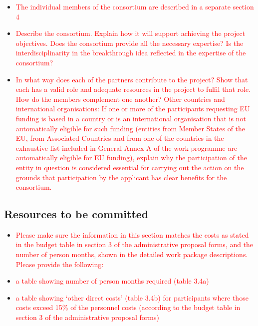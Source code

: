 \documentclass[12pt, a4paper]{article} %
\begin{document}
  \begin{itemize}
    \item \textcolor{red}{The individual members of the consortium are
        described in a separate section 4}
      \item \textcolor{red}{Describe the consortium. Explain how it will
    support achieving the project objectives.  Does the consortium
    provide all the necessary expertise? Is the interdisciplinarity in
    the breakthrough idea reflected in the expertise of the
    consortium?}
\item \textcolor{red}{In what way does each of the partners contribute
    to the project? Show that each has a valid role and adequate
    resources in the project to fulfil that role. How do the members
    complement one another? Other countries and international
    organisations: If one or more of the participants requesting EU
    funding is based in a country or is an international organisation
    that is not automatically eligible for such funding (entities from
    Member States of the EU, from Associated Countries and from one of
    the countries in the exhaustive list included in General Annex A
    of the work programme are automatically eligible for EU funding),
    explain why the participation of the entity in question is
    considered essential for carrying out the action on the grounds
    that participation by the applicant has clear benefits for the
    consortium.}
  \end{itemize}


  \subsection{Resources to be committed}
 
  \begin{itemize}
  \item \textcolor{red}{Please make sure the information in this
      section matches the costs as stated in the budget table in
      section 3 of the administrative proposal forms, and the number
      of person months, shown in the detailed work package
      descriptions.  Please provide the following:}
 \item \textcolor{red}{a table showing number of person months required
    (table 3.4a)}
  \item \textcolor{red}{a table showing ‘other direct costs’ (table
      3.4b) for participants where those costs exceed 15\% of the
      personnel costs (according to the budget table in section 3 of
      the administrative proposal forms)}
\end{itemize}
\end{document}
